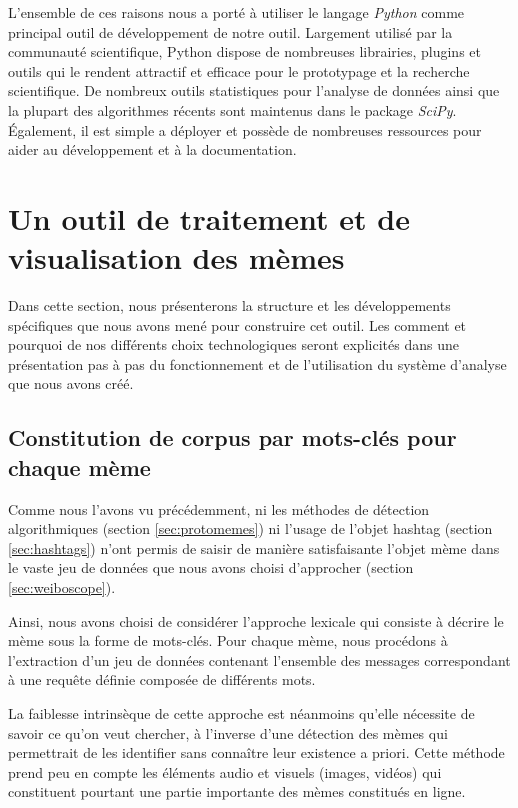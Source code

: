     L'ensemble de ces raisons nous a porté à utiliser le langage \textit{Python} comme principal outil de développement de notre outil. Largement utilisé par la communauté scientifique, Python dispose de nombreuses librairies, plugins et outils qui le rendent attractif et efficace pour le prototypage et la recherche scientifique. De nombreux outils statistiques pour l'analyse de données ainsi que la plupart des algorithmes récents sont maintenus dans le package \textit{SciPy}. Également, il est simple a déployer et possède de nombreuses ressources pour aider au développement et à la documentation.

\section{Un outil de traitement et de visualisation des mèmes}

    Dans cette section, nous présenterons la structure et les développements spécifiques que nous avons mené pour construire cet outil. Les comment et pourquoi de nos différents choix technologiques seront explicités dans une présentation pas à pas du fonctionnement et de l'utilisation du système d'analyse que nous avons créé.

\subsection[Constitution de corpus par mots-clés pour chaque mème]{Constitution de corpus par mots-clés pour chaque mème}
    \label{sec:keywords}

    Comme nous l'avons vu précédemment,  ni les méthodes de détection algorithmiques (section \ref{sec:protomemes}) ni l'usage de l'objet hashtag (section \ref{sec:hashtags}) n'ont permis de saisir de manière satisfaisante l'objet mème dans le vaste jeu de données que nous avons choisi d'approcher (section \ref{sec:weiboscope}). 

    Ainsi, nous avons choisi de considérer l'approche lexicale qui consiste à décrire le mème sous la forme de mots-clés. Pour chaque mème, nous procédons à l{\textquoteright}extraction d{\textquoteright}un jeu de données contenant l{\textquoteright}ensemble des messages correspondant à une requête définie composée de différents mots. 

    La faiblesse intrinsèque de cette approche est néanmoins qu'elle nécessite de savoir ce qu'on veut chercher, à l'inverse d'une détection des mèmes qui permettrait de les identifier sans connaître leur existence a priori. Cette méthode prend peu en compte les éléments audio et visuels (images, vidéos) qui constituent pourtant une partie importante des mèmes constitués en ligne. 

